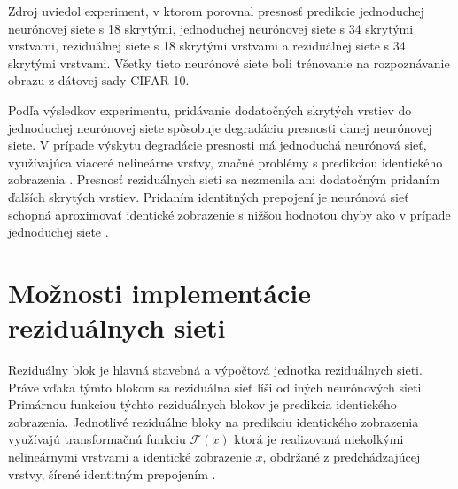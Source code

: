 Zdroj \cite{Wu2017} uviedol experiment, v ktorom porovnal presnosť predikcie jednoduchej neurónovej siete s 18 skrytými, jednoduchej neurónovej siete s 34 skrytými vrstvami, reziduálnej siete s 18 skrytými vrstvami a reziduálnej siete s 34 skrytými vrstvami. Všetky tieto neurónové siete boli trénovanie na rozpoznávanie obrazu z dátovej sady CIFAR-10.

Podľa výsledkov experimentu, pridávanie dodatočných skrytých vrstiev do jednoduchej neurónovej siete spôsobuje degradáciu presnosti danej neurónovej siete. V prípade výskytu degradácie presnosti má jednoduchá neurónová sieť, využívajúca viaceré nelineárne vrstvy, značné problémy s predikciou identického zobrazenia \cite{Wu2017}. Presnosť reziduálnych sieti sa nezmenila ani dodatočným pridaním ďalších skrytých vrstiev. Pridaním identitných prepojení je neurónová sieť schopná aproximovať identické zobrazenie s nižšou hodnotou chyby ako v prípade jednoduchej siete \cite{Wu2017}.

\section{Možnosti implementácie reziduálnych sieti}
\label{implementation}

Reziduálny blok je hlavná stavebná a výpočtová jednotka reziduálnych sieti. Práve vďaka týmto blokom sa reziduálna sieť líši od iných neurónových sieti. Primárnou funkciou týchto reziduálnych blokov je predikcia identického zobrazenia. Jednotlivé reziduálne bloky na predikciu identického zobrazenia využívajú transformačnú funkciu $\mathcal{F}(x)$ ktorá je realizovaná niekoľkými nelineárnymi vrstvami a identické zobrazenie $x$, obdržané z predchádzajúcej vrstvy, šírené identitným prepojením \cite{He2016}. 

